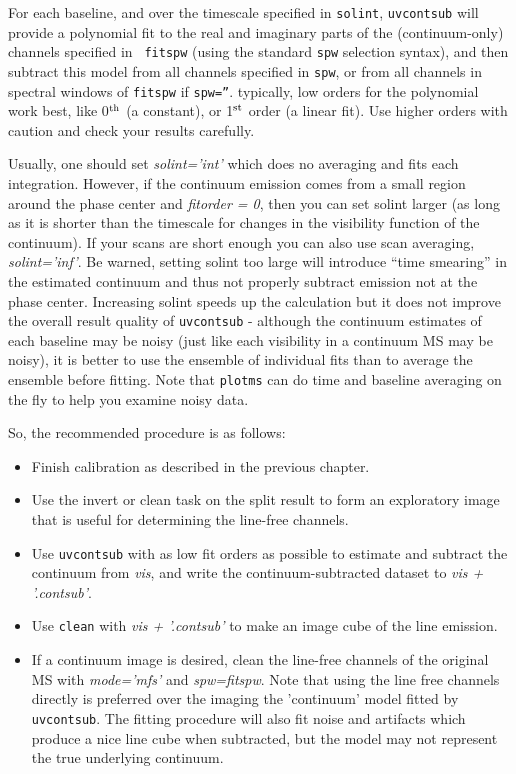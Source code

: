 For each baseline, and over the timescale specified in {\tt solint},
{\tt uvcontsub} will provide a polynomial fit to the real and
imaginary parts of the (continuum-only) channels specified in {\tt
fitspw} (using the standard {\tt spw} selection syntax), 
and then subtract this model from all channels specified in {\tt spw}, or
from all channels in spectral windows of {\tt fitspw} if {\tt spw=''}.
typically, low orders for the polynomial work best, like 0$^{\rm th}$ (a
constant), or 1$^{\rm st}$ order (a linear fit). Use higher orders with caution
and check your results carefully.

Usually, one should set {\it solint='int'} which does no averaging and fits
each integration. However, if the continuum emission comes from a small
region around the phase center and {\it fitorder = 0}, then you can set solint
larger (as long as it is shorter than the timescale for changes in the
visibility function of the continuum).  If your scans are short enough you
can also use scan averaging, {\it solint='inf'}. Be warned, setting solint too
large will introduce ``time smearing'' in the estimated continuum and thus
not properly subtract emission not at the phase center.  Increasing solint
speeds up the calculation but it does not improve the overall result
quality of {\tt uvcontsub} - although the continuum estimates of each baseline
may be noisy (just like each visibility in a continuum MS may be noisy),
it is better to use the ensemble of individual fits than to average the
ensemble before fitting.  Note that {\tt plotms} can do time and baseline
averaging on the fly to help you examine noisy data.


So, the recommended procedure is as follows:
\begin{itemize}
\item Finish calibration as described in the previous chapter.
\item Use the invert or clean task on the split result to form an exploratory
  image that is useful for determining the line-free channels.
\item Use {\tt uvcontsub} with as low fit orders as possible to estimate and subtract the
  continuum from {\it vis}, and write the continuum-subtracted dataset
  to {\it vis + '.contsub'}.
\item Use {\tt clean} with {\it vis + '.contsub'} to make an image cube of the line emission.
\item If a continuum image is desired, clean the line-free channels of the
  original MS with {\it mode='mfs'} and {\it spw=fitspw}. Note that
  using the line free channels directly is preferred over the imaging
  the 'continuum' model fitted by {\tt uvcontsub}. The fitting
  procedure will also fit noise and artifacts which produce a nice
  line cube when subtracted, but the model may not represent the true
  underlying continuum.   
\end{itemize}

